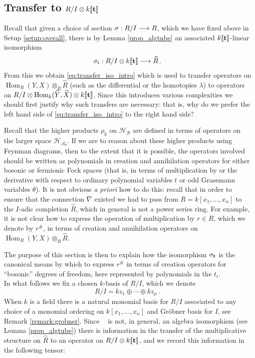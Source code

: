 \documentclass[english,letter paper,12pt,leqno]{article}
\theoremstyle{example}
\numberwithin{equation}{section}
\def\AA{\mathcal{A}}
\def\BB{\mathcal{B}}
\def\HH{\HH}
\def\HH{\mathcal{H}}
\def\Hom{\operatorname{Hom}}
\DeclareMathOperator{\sigmastar}{\sigma_t}
\begin{document}
\subsection{Transfer to $R/I \otimes k\llbracket \bold{t} \rrbracket$}

Recall that given a choice of section $\sigma: R/I \longrightarrow R$, which we have fixed above in Setup \ref{setup:overall}, there is by Lemma \ref{prop_algtube} an associated $k\llbracket \bold{t} \rrbracket$-linear isomorphism
\[
\sigmastar: R/I \otimes k \llbracket \bold{t} \rrbracket \lto \widehat{R}\,.
\]
From this we obtain \eqref{eq:transfer_iso_intro} which is used to transfer operators on $\Hom_R(Y,X) \otimes_R \widehat{R}$ (such as the differential or the homotopies $\lambda$) to operators on $R/I \otimes \Hom_k(\widetilde{Y}, \widetilde{X}) \otimes k\llbracket \bold{t} \rrbracket$. Since this introduces various complexities we should first justify why such transfers are necessary: that is, why do we prefer the left hand side of \eqref{eq:transfer_iso_intro} to the right hand side?

Recall that the higher products $\rho_k$ on $\HH_{\BB}$ are defined in terms of operators on the larger space $\HH_{\AA_\theta}$. If we are to reason about these higher products using Feynman diagrams, then to the extent that it is possible, the operators involved should be written as polynomials in creation and annihilation operators for either bosonic or fermionic Fock spaces (that is, in terms of multiplication by or the derivative with respect to ordinary polynomial variables $t$ or odd Grassmann variables $\theta$). It is not obvious \emph{a priori} how to do this: recall that in order to ensure that the connection $\nabla$ existed we had to pass from $R = k[x_1,\ldots,x_n]$ to the $I$-adic completion $\widehat{R}$, which in general is not a power series ring. For example, it is not clear how to express the operation of multiplication by $r \in R$, which we denote by $r^{\#}$, in terms of creation and annihilation operators on $\Hom_R(Y,X) \otimes_R \widehat{R}$.

The purpose of this section is then to explain how the isomorphism $\sigma_{\bold{t}}$ is the canonical means by which to express $r^{\#}$ in terms of creation operators for ``bosonic'' degrees of freedom, here represented by polynomials in the $t_i$.
\\

In what follows we fix a chosen $k$-basis of $R/I$, which we denote
\[
R/I = k z_1 \oplus \cdots \oplus k z_\mu\,.
\]
When $k$ is a field there is a natural monomial basis for $R/I$ associated to any choice of a monomial ordering on $k[x_1,\ldots,x_n]$ and Gr\"obner basis for $I$, see Remark \ref{remark:grobner}. Since $\sigmastar$ is not, in general, an algebra isomorphism (see Lemma \ref{prop_algtube}) there is information in the transfer of the multiplicative structure on $\widehat{R}$ to an operator on $R/I \otimes k\llbracket \bold{t} \rrbracket$, and we record this information in the following tensor:
\end{document}
